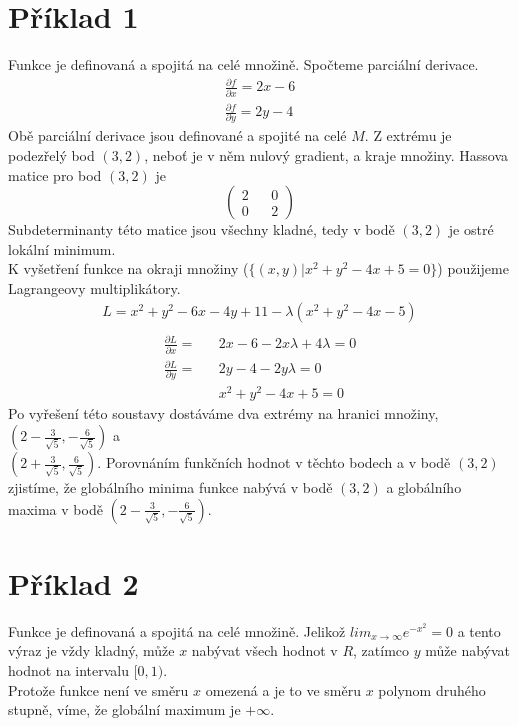 \documentclass[11pt,a4paper]{article}
\begin{document}
\section*{Příklad 1}
Funkce je definovaná a spojitá na celé množině. Spočteme parciální derivace.
\begin{align*}
\frac{\partial f}{\partial x} = 2x - 6 \\
\frac{\partial f}{\partial y} = 2y - 4 
\end{align*}
Obě parciální derivace jsou definované a spojité na celé $M$. Z extrému je podezřelý bod $(3,2)$, neboť je v něm nulový gradient, a kraje množiny. Hassova matice pro bod $(3,2)$ je 
$$
\left(
\begin{matrix}
2 && 0\\
0 && 2
\end{matrix}
\right)
$$
Subdeterminanty této matice jsou všechny kladné, tedy v bodě $(3,2)$ je ostré lokální minimum. \\

K vyšetření funkce na okraji množiny ($\{(x,y) \vert x^2 + y^2 - 4x + 5 = 0\}$) použijeme Lagrangeovy multiplikátory.
\begin{align*}
L = x^2+y^2-6x-4y + 11 - \lambda (x^2+y^2-4x-5) \\
\end{align*}
\begin{align*}
\frac{\partial L}{\partial x} = && 2x - 6 - 2x\lambda + 4\lambda = 0 \\
\frac{\partial L}{\partial y} = && 2y - 4 - 2y\lambda = 0 \\
&& x^2+y^2-4x+5 = 0
\end{align*}
Po vyřešení této soustavy dostáváme dva extrémy na hranici množiny, $(2-\frac{3}{\sqrt{5}}, -\frac{6}{\sqrt{5}})$ a \\$(2+\frac{3}{\sqrt{5}}, \frac{6}{\sqrt{5}})$.
Porovnáním funkčních hodnot v těchto bodech a v bodě $(3,2)$ zjistíme, že globálního minima funkce nabývá v bodě $(3,2)$ a globálního maxima v bodě $(2-\frac{3}{\sqrt{5}}, -\frac{6}{\sqrt{5}})$. 
\section*{Příklad 2}
Funkce je definovaná a spojitá na celé množině. Jelikož $lim_{x\to \infty} e^{-x^2} = 0$ a tento výraz je vždy kladný, může $x$ nabývat všech hodnot v $R$, zatímco $y$ může nabývat hodnot na intervalu $[0,1)$. \\

Protože funkce není ve směru $x$ omezená a je to ve směru $x$ polynom druhého stupně, víme, že globální maximum je $+\infty$.\\
\end{document}
